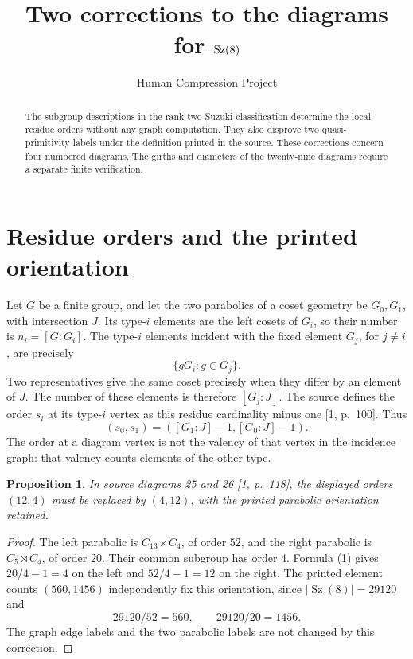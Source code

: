 \documentclass[11pt]{article}
\title{Two corrections to the diagrams for $\Sz(8)$}
\author{Human Compression Project}
\date{}
\newtheorem{proposition}{Proposition}
\newcommand{\Sz}{\operatorname{Sz}}
\begin{document}
\maketitle
\begin{abstract}
The subgroup descriptions in the rank-two Suzuki classification determine
the local residue orders without any graph computation. They also disprove
two quasi-primitivity labels under the definition printed in the source.
These corrections concern four numbered diagrams. The girths and diameters
of the twenty-nine diagrams require a separate finite verification.
\end{abstract}

\section{Residue orders and the printed orientation}
Let $G$ be a finite group, and let the two parabolics of a coset geometry be
$G_0,G_1$, with intersection $J$. Its type-$i$ elements are the left cosets
of $G_i$, so their number is $n_i=[G:G_i]$. The type-$i$ elements incident
with the fixed element $G_j$, for $j\ne i$, are precisely
\[
 \{gG_i:g\in G_j\}.
\]
Two representatives give the same coset precisely when they differ by an
element of $J$. The number of these elements is therefore $[G_j:J]$.
The source defines the order $s_i$ at its type-$i$ vertex as this residue
cardinality minus one [1, p.~100]. Thus
\begin{equation}
 (s_0,s_1)=([G_1:J]-1,[G_0:J]-1).                 \tag{1}
\end{equation}
The order at a diagram vertex is not the valency of that vertex in the
incidence graph: that valency counts elements of the other type.

\begin{proposition}
In source diagrams 25 and 26 [1, p.~118], the displayed orders $(12,4)$
must be replaced by $(4,12)$, with the printed parabolic orientation retained.
\end{proposition}
\begin{proof}
The left parabolic is $C_{13}\rtimes C_4$, of order $52$, and the right
parabolic is $C_5\rtimes C_4$, of order $20$. Their common subgroup has
order $4$. Formula (1) gives $20/4-1=4$ on the left and $52/4-1=12$
on the right. The printed element counts $(560,1456)$ independently fix
this orientation, since $|\Sz(8)|=29120$ and
\[
 29120/52=560,\qquad 29120/20=1456.
\]
The graph edge labels and the two parabolic labels are not changed by
this correction.
\end{proof}
\end{document}
